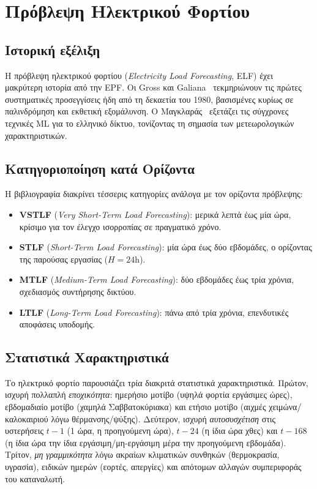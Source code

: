 \section{Πρόβλεψη Ηλεκτρικού Φορτίου}
\label{sec:elf_review}

\subsection{Ιστορική εξέλιξη}

Η πρόβλεψη ηλεκτρικού φορτίου (\textit{Electricity Load
Forecasting}, ELF) έχει μακρύτερη ιστορία από την EPF.
Οι Gross και Galiana~\cite{gross1987} τεκμηριώνουν τις
πρώτες συστηματικές προσεγγίσεις ήδη από τη δεκαετία
του 1980, βασισμένες κυρίως σε παλινδρόμηση και εκθετική
εξομάλυνση. Ο Μαγκλαράς~\cite{magklaras2018} εξετάζει
τις σύγχρονες τεχνικές ML για το ελληνικό δίκτυο,
τονίζοντας τη σημασία των μετεωρολογικών χαρακτηριστικών.

\subsection{Κατηγοριοποίηση κατά Ορίζοντα}

Η βιβλιογραφία διακρίνει τέσσερις κατηγορίες ανάλογα
με τον ορίζοντα πρόβλεψης:

\begin{itemize}
  \item \textbf{VSTLF} (\textit{Very Short-Term Load Forecasting}):
        μερικά λεπτά έως μία ώρα, κρίσιμο για τον έλεγχο
        ισορροπίας σε πραγματικό χρόνο.
  \item \textbf{STLF} (\textit{Short-Term Load Forecasting}):
        μία ώρα έως δύο εβδομάδες, ο ορίζοντας της παρούσας εργασίας ($H=24$h).
  \item \textbf{MTLF} (\textit{Medium-Term Load Forecasting}):
        δύο εβδομάδες έως τρία χρόνια, σχεδιασμός συντήρησης δικτύου.
  \item \textbf{LTLF} (\textit{Long-Term Load Forecasting}):
        πάνω από τρία χρόνια, επενδυτικές αποφάσεις υποδομής.
\end{itemize}

\subsection{Στατιστικά Χαρακτηριστικά}

Το ηλεκτρικό φορτίο παρουσιάζει τρία διακριτά
στατιστικά χαρακτηριστικά. Πρώτον, ισχυρή πολλαπλή
\emph{εποχικότητα}: ημερήσιο μοτίβο (υψηλά φορτία εργάσιμες
ώρες), εβδομαδιαίο μοτίβο (χαμηλά Σαββατοκύριακα) και ετήσιο
μοτίβο (αιχμές χειμώνα/καλοκαιριού λόγω θέρμανσης/ψύξης).
Δεύτερον, ισχυρή \emph{αυτοσυσχέτιση} στις υστερήσεις
$t-1$ (1 ώρα, η προηγούμενη ώρα), $t-24$ (η ίδια ώρα χθες) και
$t-168$ (η ίδια ώρα την ίδια εργάσιμη/μη-εργάσιμη μέρα
την προηγούμενη εβδομάδα). Τρίτον, \emph{μη γραμμικότητα}
λόγω ακραίων κλιματικών συνθηκών (θερμοκρασία, υγρασία),
ειδικών ημερών (εορτές, απεργίες) και απότομων αλλαγών
συμπεριφοράς του καταναλωτή.

